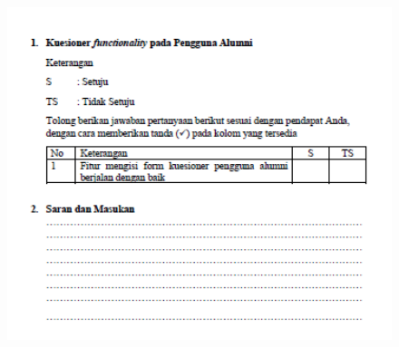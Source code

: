 \begin{figure}[H]
	\centering
	\includegraphics[width=15cm,height=18cm]{gambar/UAT/kf_pengguna}
	\label{kf_pengguna}
\end{figure}

